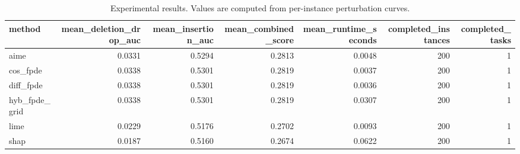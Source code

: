 \begin{table}[t]
\caption{Experimental results. Values are computed from per-instance perturbation curves.}
\label{tab:main_results_computed}
\centering
\begin{tabular}{lrrrrrr}
\toprule
method & mean\_deletion\_drop\_auc & mean\_insertion\_auc & mean\_combined\_score & mean\_runtime\_seconds & completed\_instances & completed\_tasks \\
\midrule
aime & 0.0331 & 0.5294 & 0.2813 & 0.0048 & 200 & 1 \\
cos\_fpde & 0.0338 & 0.5301 & 0.2819 & 0.0037 & 200 & 1 \\
diff\_fpde & 0.0338 & 0.5301 & 0.2819 & 0.0036 & 200 & 1 \\
hyb\_fpde\_grid & 0.0338 & 0.5301 & 0.2819 & 0.0307 & 200 & 1 \\
lime & 0.0229 & 0.5176 & 0.2702 & 0.0093 & 200 & 1 \\
shap & 0.0187 & 0.5160 & 0.2674 & 0.0622 & 200 & 1 \\
\bottomrule
\end{tabular}

\end{table}
